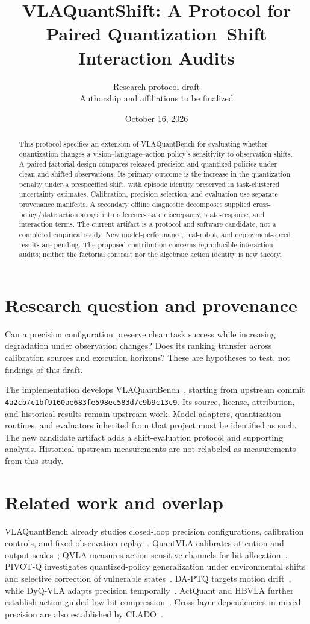 \documentclass[11pt]{article}
\title{VLAQuantShift: A Protocol for Paired Quantization--Shift Interaction Audits}
\author{Research protocol draft\\Authorship and affiliations to be finalized}
\date{October 16, 2026}
\begin{document}
\maketitle
\begin{abstract}
This protocol specifies an extension of VLAQuantBench for evaluating whether
quantization changes a vision--language--action policy's sensitivity to
observation shifts. A paired factorial design compares released-precision and
quantized policies under clean and shifted observations. Its primary outcome is
the increase in the quantization penalty under a prespecified shift, with
episode identity preserved in task-clustered uncertainty estimates. Calibration,
precision selection, and evaluation use separate provenance manifests. A
secondary offline diagnostic decomposes supplied cross-policy/state action
arrays into reference-state discrepancy, state-response, and interaction terms.
The current artifact is a protocol and software candidate, not a completed
empirical study. New model-performance, real-robot, and deployment-speed results
are pending. The proposed contribution concerns reproducible interaction audits;
neither the factorial contrast nor the algebraic action identity is new theory.
\end{abstract}

\section{Research question and provenance}
Can a precision configuration preserve clean task success while increasing
degradation under observation changes? Does its ranking transfer across
calibration sources and execution horizons? These are hypotheses to test, not
findings of this draft.

The implementation develops VLAQuantBench~\cite{xu2026vlaquantbench}, starting
from upstream commit
\texttt{4a2cb7c1bf9160ae683fe598ec583d7c9b9c13c9}.
Its source, license, attribution, and historical results remain upstream work.
Model adapters, quantization routines, and evaluators inherited from that project
must be identified as such. The new candidate artifact adds a shift-evaluation
protocol and supporting analysis. Historical upstream measurements are not
relabeled as measurements from this study.

\section{Related work and overlap}
VLAQuantBench already studies closed-loop precision configurations, calibration
controls, and fixed-observation replay~\cite{xu2026vlaquantbench}.
QuantVLA calibrates attention and output scales~\cite{zhang2026quantvla};
QVLA measures action-sensitive channels for bit allocation~\cite{xu2026qvla}.
PIVOT-Q investigates quantized-policy generalization under environmental shifts
and selective correction of vulnerable states~\cite{ruan2026pivotq}.
DA-PTQ targets motion drift~\cite{xu2026daptq}, while DyQ-VLA adapts precision
temporally~\cite{zheng2026dyqvla}. ActQuant and HBVLA further establish
action-guided low-bit compression~\cite{akbari2026actquant,yan2026hbvla}.
Cross-layer dependencies in mixed precision are also established by
CLADO~\cite{deng2025clado}.
\end{document}

